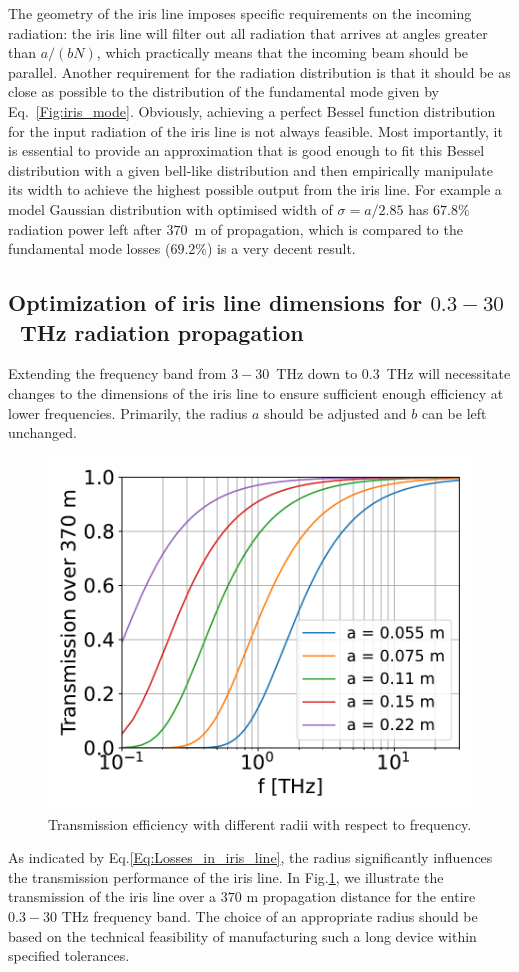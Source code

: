     The geometry of the iris line imposes specific requirements on the incoming radiation: the iris line will filter out all radiation that arrives at angles greater than $a/(bN)$, which practically means that the incoming beam should be parallel. Another requirement for the radiation distribution is that it should be as close as possible to the distribution of the fundamental mode given by Eq.~\ref{Fig:iris_mode}. Obviously, achieving a perfect Bessel function distribution for the input radiation of the iris line is not always feasible. Most importantly, it is essential to provide an approximation that is good enough to fit this Bessel distribution with a given bell-like distribution and then empirically manipulate its width to achieve the highest possible output from the iris line. For example a model Gaussian distribution with optimised width of $\sigma = a / 2.85$ has $67.8 \%$ radiation power left after $370$~m of propagation, which is compared to the fundamental mode losses ($69.2 \%$) is a very decent result. 
    

\subsection{Optimization of iris line dimensions for $0.3 - 30$~THz radiation propagation}
\label{Sec:Optimization of iris line dimensions for 0.3 - 30 THz radiation propagation}
    Extending the frequency band from $3 - 30$~THz down to $0.3$~THz will necessitate changes to the dimensions of the iris line to ensure sufficient enough efficiency at lower frequencies. Primarily, the radius $a$ should be adjusted and $b$ can be left unchanged. 
    \begin{figure}[h!]
    	\centering
    		\includegraphics[trim={0 0cm 0 0cm}, width=0.55\linewidth]{content/images/transport/power_left4a.pdf}
    		\centering
            \captionsetup{justification=centering}
        	\caption{Transmission efficiency with different radii with respect to frequency.}
        \label{Fig:power_left4a}
    \end{figure}  
    As indicated by Eq.\ref{Eq:Losses_in_iris_line}, the radius significantly influences the transmission performance of the iris line. In Fig.\ref{Fig:power_left4a}, we illustrate the transmission of the iris line over a $370$ m propagation distance for the entire $0.3 - 30$ THz frequency band. The choice of an appropriate radius should be based on the technical feasibility of manufacturing such a long device within specified tolerances.

